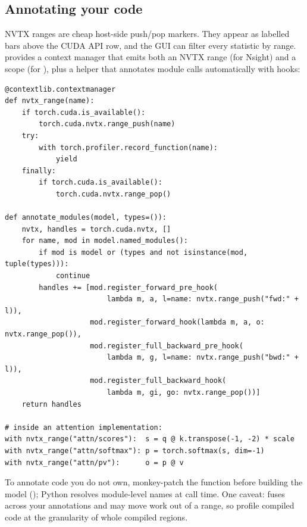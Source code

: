 \subsection{Annotating your code}

NVTX ranges are cheap host-side push/pop markers. They appear as labelled bars above the CUDA API
row, and the GUI can filter every statistic by range.  provides a context manager
that emits both an NVTX range (for Nsight) and a  scope (for
), plus a helper that annotates module calls automatically with hooks:

\begin{lstlisting}[caption={NVTX annotation by hand and by hooks (from \texttt{llmsys/perf.py}).},label={lst:perf:nvtx}]
@contextlib.contextmanager
def nvtx_range(name):
    if torch.cuda.is_available():
        torch.cuda.nvtx.range_push(name)
    try:
        with torch.profiler.record_function(name):
            yield
    finally:
        if torch.cuda.is_available():
            torch.cuda.nvtx.range_pop()

def annotate_modules(model, types=()):
    nvtx, handles = torch.cuda.nvtx, []
    for name, mod in model.named_modules():
        if mod is model or (types and not isinstance(mod, tuple(types))):
            continue
        handles += [mod.register_forward_pre_hook(
                        lambda m, a, l=name: nvtx.range_push("fwd:" + l)),
                    mod.register_forward_hook(lambda m, a, o: nvtx.range_pop()),
                    mod.register_full_backward_pre_hook(
                        lambda m, g, l=name: nvtx.range_push("bwd:" + l)),
                    mod.register_full_backward_hook(
                        lambda m, gi, go: nvtx.range_pop())]
    return handles

# inside an attention implementation:
with nvtx_range("attn/scores"):  s = q @ k.transpose(-1, -2) * scale
with nvtx_range("attn/softmax"): p = torch.softmax(s, dim=-1)
with nvtx_range("attn/pv"):      o = p @ v
\end{lstlisting}

To annotate code you do not own, monkey-patch the function before building the model
(); Python resolves module-level names at call
time. One caveat:  fuses across your annotations and may move work out of a
range, so profile compiled code at the granularity of whole compiled regions.

